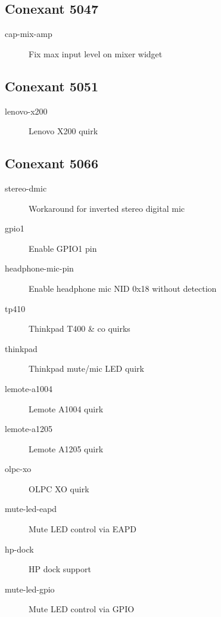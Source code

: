 \documentclass[a4paper,8pt,english]{sphinxmanual}
\begin{document}
\subsection{Conexant 5047}
\label{sound/hd-audio/models:conexant-5047}\begin{description}
\item[{cap-mix-amp}] \leavevmode
Fix max input level on mixer widget

\end{description}


\subsection{Conexant 5051}
\label{sound/hd-audio/models:conexant-5051}\begin{description}
\item[{lenovo-x200}] \leavevmode
Lenovo X200 quirk

\end{description}


\subsection{Conexant 5066}
\label{sound/hd-audio/models:conexant-5066}\begin{description}
\item[{stereo-dmic}] \leavevmode
Workaround for inverted stereo digital mic

\item[{gpio1}] \leavevmode
Enable GPIO1 pin

\item[{headphone-mic-pin}] \leavevmode
Enable headphone mic NID 0x18 without detection

\item[{tp410}] \leavevmode
Thinkpad T400 \& co quirks

\item[{thinkpad}] \leavevmode
Thinkpad mute/mic LED quirk

\item[{lemote-a1004}] \leavevmode
Lemote A1004 quirk

\item[{lemote-a1205}] \leavevmode
Lemote A1205 quirk

\item[{olpc-xo}] \leavevmode
OLPC XO quirk

\item[{mute-led-eapd}] \leavevmode
Mute LED control via EAPD

\item[{hp-dock}] \leavevmode
HP dock support

\item[{mute-led-gpio}] \leavevmode
Mute LED control via GPIO

\end{description}
\end{document}
